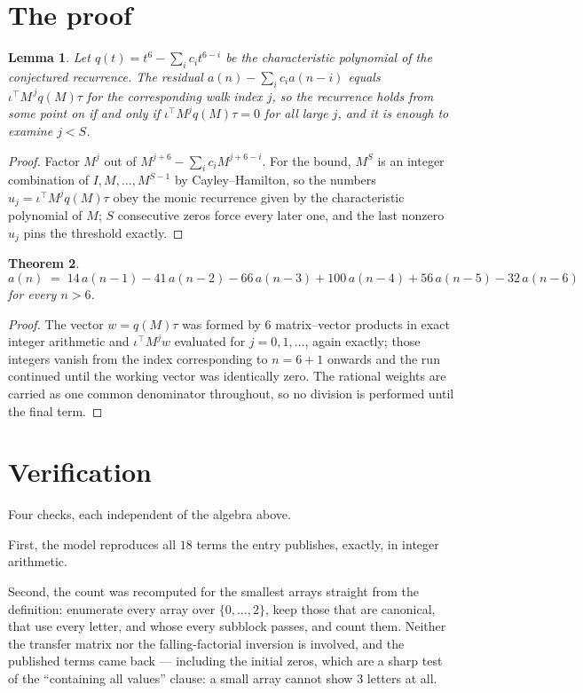 \documentclass[11pt,a4paper]{article}
\theoremstyle{plain}
\newtheorem{theorem}{Theorem}
\newtheorem{lemma}[theorem]{Lemma}
\theoremstyle{definition}
\begin{document}
\section{The proof}

\begin{lemma}\label{lem:crit}
Let $q(t)=t^{6}-\sum_i c_it^{6-i}$ be the characteristic polynomial of the
conjectured recurrence. The residual $a(n)-\sum_ic_ia(n-i)$ equals
$\iota^{\!\top}M^{\,j}q(M)\tau$ for the corresponding walk index $j$, so the recurrence
holds from some point on if and only if $\iota^{\!\top}M^{j}q(M)\tau=0$ for all large $j$,
and it is enough to examine $j<S$.
\end{lemma}

\begin{proof}
Factor $M^{j}$ out of $M^{j+6}-\sum_ic_iM^{j+6-i}$. For the bound, $M^{S}$
is an integer combination of $I,M,\dots,M^{S-1}$ by Cayley--Hamilton, so the numbers
$u_j=\iota^{\!\top}M^{j}q(M)\tau$ obey the monic recurrence given by the characteristic
polynomial of $M$; $S$ consecutive zeros force every later one, and the last nonzero $u_j$
pins the threshold exactly.
\end{proof}

\begin{theorem}
\[
a(n)\;=\;14\,a(n-1) - 41\,a(n-2) - 66\,a(n-3) + 100\,a(n-4) + 56\,a(n-5) - 32\,a(n-6)
\]
for every $n>6$.
\end{theorem}

\begin{proof}
The vector $w=q(M)\tau$ was formed by $6$ matrix--vector products in exact integer
arithmetic and $\iota^{\!\top}M^{j}w$ evaluated for $j=0,1,\dots$, again exactly; those
integers vanish from the index corresponding to $n=6+1$ onwards and the run continued
until the working vector was identically zero. The rational weights are carried as one common
denominator throughout, so no division is performed until the final term.
\end{proof}

\section{Verification}

Four checks, each independent of the algebra above.

First, the model reproduces all $18$ terms the entry publishes, exactly, in integer
arithmetic.

Second, the count was recomputed for the smallest arrays straight from the definition:
enumerate every array over $\{0,\dots,2\}$, keep those that are canonical, that use every
letter, and whose every subblock passes, and count them. Neither the transfer matrix nor the
falling-factorial inversion is involved, and the published terms came back --- including the
initial zeros, which are a sharp test of the ``containing all values'' clause: a small array
cannot show $3$ letters at all.
\end{document}
